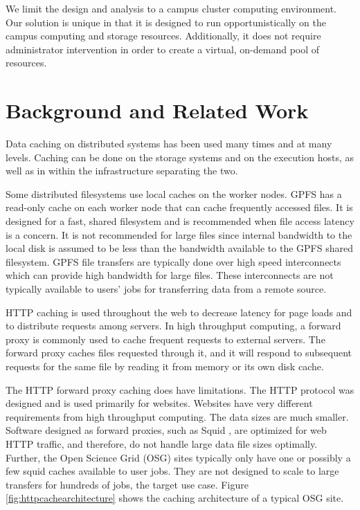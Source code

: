  


We limit the design and analysis to a campus cluster computing environment.  Our solution is unique in that it is designed to run opportunistically on the campus computing and storage resources.  Additionally, it does not require administrator intervention in order to create a virtual, on-demand pool of resources.


\section{Background and Related Work}


Data caching on distributed systems has been used many times and at many levels.  Caching can be done on the storage systems and on the execution hosts, as well as in within the infrastructure separating the two.

Some distributed filesystems use local caches on the worker nodes.  GPFS \cite{schmuck2002gpfs} has a read-only cache on each worker node that can cache frequently accessed files.  It is designed for a fast, shared filesystem and is recommended when file access latency is a concern.  It is not recommended for large files since internal bandwidth to the local disk is assumed to be less than the bandwidth available to the GPFS shared filesystem.  GPFS file transfers are typically done over high speed interconnects which can provide high bandwidth for large files.  These interconnects are not typically available to users' jobs for transferring data from a remote source.


HTTP caching is used throughout the web to decrease latency for page loads and to distribute requests among servers.  In high throughput computing, a forward proxy is commonly used to cache frequent requests to external servers.  The forward proxy caches files requested through it, and it will respond to subsequent requests for the same file by reading it from memory or its own disk cache.

The HTTP forward proxy caching does have limitations.  The HTTP protocol was designed and is used primarily for websites.  Websites have very different requirements from high throughput computing.  The data sizes are much smaller.  Software designed as forward proxies, such as Squid \cite{squidcacheurl}, are optimized for web HTTP traffic, and therefore, do not handle large data file sizes optimally.  Further, the Open Science Grid (OSG) \cite{pordes2007open} sites typically only have one or possibly a few squid caches available to user jobs.  They are not designed to scale to large transfers for hundreds of jobs, the target use case.  Figure \ref{fig:httpcachearchitecture} shows the caching architecture of a typical OSG site.

